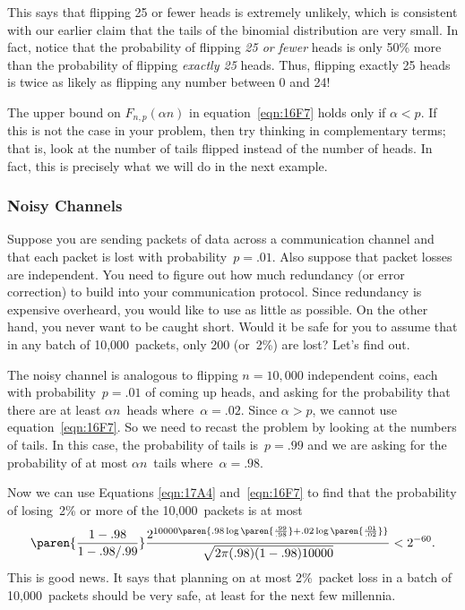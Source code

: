\begin{editingnotes}
This says that flipping 25 or fewer heads is extremely unlikely, which
is consistent with our earlier claim that the tails of the binomial
distribution are very small.  In fact, notice that the probability of
flipping \emph{25 or fewer} heads is only 50\% more than the
probability of flipping \emph{exactly 25} heads.  Thus, flipping
exactly 25 heads is twice as likely as flipping any number between 0
and 24!

\begin{caveat}
The upper bound on $F_{n, p}(\alpha n)$ in equation~\eqref{eqn:16F7}
holds only if $\alpha < p$.  If this is not the case in your problem,
then try thinking in complementary terms; that is, look at the number
of tails flipped instead of the number of heads.  In fact, this is
precisely what we will do in the next example.
\end{caveat}

\subsubsection{Noisy Channels}

Suppose you are sending packets of data across a communication channel
and that each packet is lost with probability~$p = .01$.  Also suppose
that packet losses are independent.  You need to figure out how much
redundancy (or error correction) to build into your communication
protocol.  Since redundancy is expensive overheard, you would like to
use as little as possible.  On the other hand, you never want to be
caught short.  Would it be safe for you to assume that in any batch
of 10,000~packets, only 200 (or~2\%) are lost?  Let's find out.

The noisy channel is analogous to flipping $n = 10{,}000$ independent
coins, each with probability~$p = .01$ of coming up heads, and asking
for the probability that there are at least $\alpha n$~heads
where~$\alpha = .02$.  Since $\alpha > p$, we cannot use
equation~\eqref{eqn:16F7}.  So we need to recast the problem by looking
at the numbers of tails.  In this case, the probability of tails is~$p
= .99$ and we are asking for the probability of at most $\alpha
n$~tails where~$\alpha = .98$.

Now we can use Equations \ref{eqn:17A4} and~\ref{eqn:16F7} to find
that the probability of losing~2\% or more of the 10,000~packets is at
most
\begin{equation*}
    \paren{\frac{1 - .98}{1 - .98/.99}}
    \frac{ 2^{10000\paren{.98 \log\paren{\frac{.99}{.98}}
                        + .02 \log\paren{\frac{.01}{.02}}} } }
         {\sqrt{2\pi (.98)(1 - .98) 10000}}
    < 2^{-60}.
\end{equation*}
This is good news.  It says that planning on at most 2\%~packet loss
in a batch of 10,000~packets should be very safe, at least for the
next few millennia.


\end{editingnotes}
